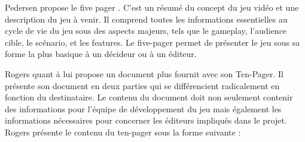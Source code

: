Pedersen propose le five pager \cite{GD_foundations_pedersen}. C'est un résumé du concept du jeu vidéo et une description du jeu à venir. Il comprend toutes les informations essentielles au cycle de vie du jeu sous des aspects majeurs, tels que le gameplay, l'audience cible, le scénario, et les features. Le five-pager permet de présenter le jeu sous sa forme la plus basique à un décideur ou à un éditeur.

Rogers \cite{LevelUpRogers2014} quant à lui propose un document plus fournit avec son Ten-Pager. Il présente son document en deux parties qui se différencient radicalement en fonction du destinataire. Le contenu du document doit non seulement contenir des informations pour l'équipe de développement du jeu mais également les informations nécessaires pour concerner les éditeurs impliqués dans le projet. Rogers présente le contenu du ten-pager sous la forme suivante :
